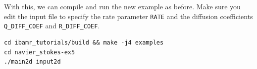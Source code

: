\documentclass{article}
\begin{document}
With this, we can compile and run the new example as before. Make sure you edit the input file to specify the rate parameter \verb|RATE| and the diffusion coefficients \verb|Q_DIFF_COEF| and \verb|R_DIFF_COEF|.
\begin{verbatim}
cd ibamr_tutorials/build && make -j4 examples
cd navier_stokes-ex5
./main2d input2d
\end{verbatim}
\end{document}
